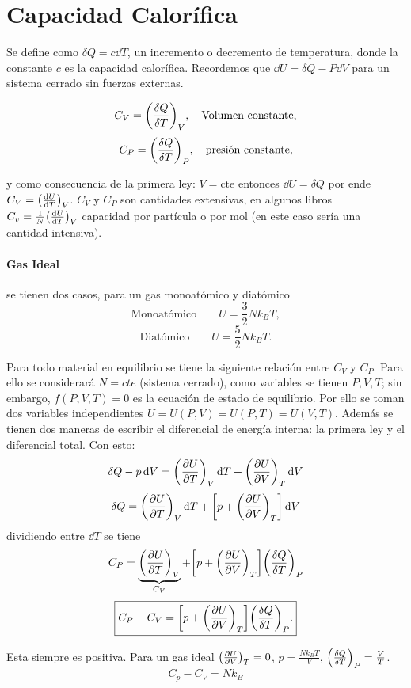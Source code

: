 \section{Capacidad Calorífica}

Se define como $\delta Q = c \dd{T}$, un incremento o decremento de temperatura, donde la constante $c$ es la capacidad calorífica. Recordemos que $\dd{U} = \delta Q - P\dd{V}$ para un sistema cerrado sin fuerzas externas.

		$$ C_V = \qty(\frac{\delta Q}{\delta T}) _V, \quad \text{Volumen constante,} $$
		$$ C_P = \qty(\frac{\delta Q}{\delta T}) _P, \quad \text{presión constante,} $$

	y como consecuencia de la primera ley: $V=\text{cte}$ entonces $\dd{U} = \delta Q$ por ende $C_V = \qty(\dv{U}{T})_V$. $C_V$ y $C_P$ son cantidades extensivas, en algunos libros $C_v = \frac{1}{N} \qty(\dv{U}{T})_V$ capacidad por partícula o por mol (en este caso sería una cantidad intensiva).
	
\paragraph{Gas Ideal} se tienen dos casos, para un gas monoatómico y diatómico
	$$ \text{Monoatómico} \qquad U = \frac{3}{2} N k_B T, $$
	$$ \text{Diatómico} \qquad U = \frac{5}{2} N k_B T. $$

Para todo material en equilibrio se tiene la siguiente relación entre $C_V$ y $C_P$. Para ello se considerará $N=cte$ (sistema cerrado), como variables se tienen $P,V,T$; sin embargo, $f(P,V,T) = 0$ es la ecuación de estado de equilibrio. Por ello se toman dos variables independientes $U = U(P,V) = U(P,T) = U(V,T)$. Además se tienen dos maneras de escribir el diferencial de energía interna: la primera ley y el diferencial total. Con esto:
	$$ \delta Q - p\dd{V} = \qty(\pdv{U}{T})_{V} \dd{T} + \qty(\pdv{U}{V})_{T} \dd{V} $$
	$$ \delta Q = \qty(\pdv{U}{T})_{V} \dd{T} + \qty[p + \qty(\pdv{U}{V})_{T}] \dd{V} $$
dividiendo entre $\dd{T}$ se tiene
	$$ C_P = \underbrace{\qty(\pdv{U}{T})_{V}}_{C_V} + \qty[p + \qty(\pdv{U}{V})_{T}] \qty(\frac{\delta Q}{\delta T}) _P $$
	$$ \boxed{ C_P - C_V = \qty[p + \qty(\pdv{U}{V})_{T}] \qty(\frac{\delta Q}{\delta T}) _P. } $$
	
	Esta siempre es positiva. Para un gas ideal $\qty(\pdv{U}{V})_{T} = 0$, $p = \frac{Nk_B T}{V}$, $\qty(\frac{\delta Q}{\delta T}) _P = \frac{V}{T}$.
	$$ \boxed{ C_p - C_V = Nk_B } $$
	



